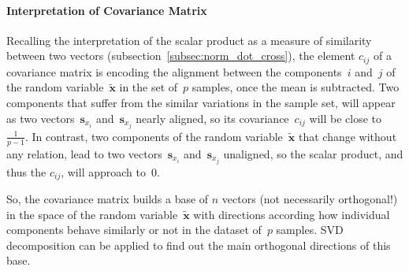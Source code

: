 \paragraph{Interpretation of Covariance Matrix}
Recalling the interpretation of the scalar product as a measure of similarity between two vectors (subsection~\ref{subsec:norm_dot_cross}), the element $c_{ij}$ of a covariance matrix is encoding the alignment between the components~$i$ and~$j$ of the random variable~$\tilde{\mathbf{x}}$ in the set of~$p$ samples, once the mean is subtracted. Two components that suffer from the similar variations in the sample set, will appear as two vectors~$\mathbf{s}_{x_i}$ and~$\mathbf{s}_{x_j}$ nearly aligned, so its covariance~$c_{ij}$ will be close to $\frac{1}{p-1}$. In contrast, two components of the random variable~$\tilde{\mathbf{x}}$ that change without any relation, lead to two vectors~$\mathbf{s}_{x_i}$ and~$\mathbf{s}_{x_j}$ unaligned, so the scalar product, and thus the $c_{ij}$, will approach to~$0$.

So, the covariance matrix builds a base of $n$ vectors (not necessarily orthogonal!) in the space of the random variable~$\tilde{\mathbf{x}}$ with directions according how individual components behave similarly or not in the dataset of~$p$ samples. SVD decomposition can be applied to find out the main orthogonal directions of this base. 

